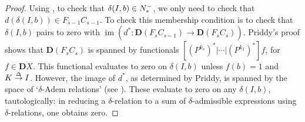 \documentclass[11pt]{amsart}
\theoremstyle{plain}
\theoremstyle{definition}
\DeclareMathOperator{\im}{im}
\renewcommand{\to}{\longrightarrow}
\theoremstyle{plain}
\newcommand{\deltaalg}{\Delta} %
\newcommand{\produces}[3]{#3:#1\sim #2}
\renewcommand{\produces}[3]{#1\rightarrow_{#3} #2}%
\renewcommand{\produces}[3]{#1\overset{\smash{#3}}{\rightarrow} #2}%
\newcommand{\Nop}{N^{\smash{-}}}
\newcommand{\dual}{\mathbf{D}}
\begin{document}
\begin{Koszul complexes}
\begin{proof}
Using \cite[Lemma 3.2]{PriddyKoszul.pdf}, to check that $\delta(I,b)\in\Nop_*$, we only need to check that $d(\delta(I,b))\in F_{s-1}C_{s-1}$.
To check this membership condition is to check that $\delta(I,b)$ pairs to zero with $\im(d^*:\dual(F_sC_{s-1})\to\dual(F_sC_s))$. Priddy's proof shows that $\dual(F_sC_s)$ is spanned by functionals $[(P^{k_s})^*|\cdots |(P^{k_1})^*]f$, for $f\in \dual X$.  This functional evaluates to zero on $\delta(I,b)$ unless $f(b)=1$ and $\produces{K}{I}{\deltaalg}$. However, the image of $d^*$, as determined by Priddy, is spanned by the space of `$\delta$-Adem relations' (see \cite[Theorem 2.5 and proof]{PriddyKoszul.pdf}). These evaluate to zero on any $\delta(I,b)$, tautologically: in reducing a $\delta$-relation to a sum of $\delta$-admissible expressions using $\delta$-relations, one obtains zero.


\end{proof}
\end{Koszul complexes}
\end{document}
